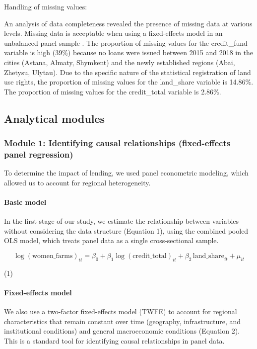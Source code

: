 ﻿\documentclass[pdflatex,sn-mathphys-ay]{sn-jnl}
\begin{document}
Handling of missing values:

An analysis of data completeness revealed the presence of missing data
at various levels. Missing data is acceptable when using a fixed-effects
model in an unbalanced panel sample \citep{ref100}. The
proportion of missing values for the credit\_fund variable is high
(39\%) because no loans were issued between 2015 and 2018 in the cities
(Astana, Almaty, Shymkent) and the newly established regions (Abai,
Zhetysu, Ulytau). Due to the specific nature of the statistical
registration of land use rights, the proportion of missing values for
the land\_share variable is 14.86\%. The proportion of missing values
for the credit\_total variable is 2.86\%.

\subsection{Analytical modules}

\subsubsection{Module 1: Identifying causal relationships (fixed-effects panel regression)}

To determine the impact of lending, we used panel econometric modeling,
which allowed us to account for regional heterogeneity.

\paragraph{Basic model}

In the first stage of our study, we estimate the relationship between
variables without considering the data structure (Equation 1), using the
combined pooled OLS model, which treats panel data as a single
cross-sectional sample.

$$
\log(\text{women\_farms})_{it} = \beta_0 + \beta_1 \log(\text{credit\_total})_{it} + \beta_2 \, \text{land\_share}_{it} + \mu_{it}
$$

(1)

\paragraph{Fixed-effects model}

We also use a two-factor fixed-effects model (TWFE) to account for
regional characteristics that remain constant over time (geography,
infrastructure, and institutional conditions) and general macroeconomic
conditions (Equation 2). This is a standard tool for identifying causal
relationships in panel data.
\end{document}
